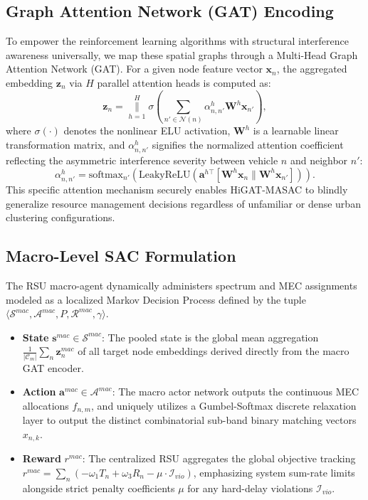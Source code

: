 \subsection{Graph Attention Network (GAT) Encoding}
To empower the reinforcement learning algorithms with structural interference awareness universally, we map these spatial graphs through a Multi-Head Graph Attention Network (GAT). For a given node feature vector $\mathbf{x}_n$, the aggregated embedding $\mathbf{z}_n$ via $H$ parallel attention heads is computed as:
\begin{equation}
    \mathbf{z}_n = \mathop{\parallel}\limits_{h=1}^H \sigma \left( \sum_{n' \in \mathcal{N}(n)} \alpha_{n,n'}^h \mathbf{W}^h \mathbf{x}_{n'} \right),
\end{equation}
where $\sigma(\cdot)$ denotes the nonlinear ELU activation, $\mathbf{W}^h$ is a learnable linear transformation matrix, and $\alpha_{n,n'}^h$ signifies the normalized attention coefficient reflecting the asymmetric interference severity between vehicle $n$ and neighbor $n'$:
\begin{equation}
    \alpha_{n,n'}^h = \text{softmax}_{n'} \left( \text{LeakyReLU} \left( \mathbf{a}^{h\top} [\mathbf{W}^h \mathbf{x}_n \parallel \mathbf{W}^h \mathbf{x}_{n'}] \right) \right).
\end{equation}
This specific attention mechanism securely enables HiGAT-MASAC to blindly generalize resource management decisions regardless of unfamiliar or dense urban clustering configurations.

\subsection{Macro-Level SAC Formulation}
The RSU macro-agent dynamically administers spectrum and MEC assignments modeled as a localized Markov Decision Process defined by the tuple $\langle \mathcal{S}^{mac}, \mathcal{A}^{mac}, P, \mathcal{R}^{mac}, \gamma \rangle$.
\begin{itemize}
    \item \textbf{State} $\mathbf{s}^{mac} \in \mathcal{S}^{mac}$: The pooled state is the global mean aggregation $\frac{1}{|\mathcal{C}_m|}\sum_{n} \mathbf{z}_n^{mac}$ of all target node embeddings derived directly from the macro GAT encoder.
    \item \textbf{Action} $\mathbf{a}^{mac} \in \mathcal{A}^{mac}$: The macro actor network outputs the continuous MEC allocations $f_{n,m}$, and uniquely utilizes a Gumbel-Softmax discrete relaxation layer to output the distinct combinatorial sub-band binary matching vectors $x_{n,k}$.
    \item \textbf{Reward} $r^{mac}$: The centralized RSU aggregates the global objective tracking $r^{mac} = \sum_n (- \omega_1 T_n + \omega_3 R_n - \mu \cdot \mathcal{I}_{vio})$, emphasizing system sum-rate limits alongside strict penalty coefficients $\mu$ for any hard-delay violations $\mathcal{I}_{vio}$.
\end{itemize}

